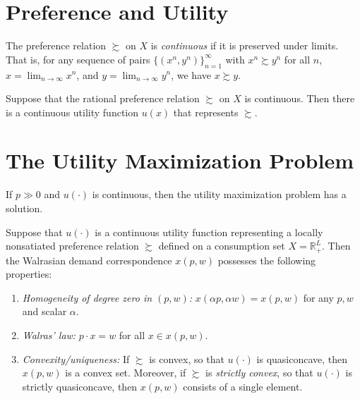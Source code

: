\section{Preference and Utility}

\begin{defn}
    The preference relation $\succsim$ on $X$ is \emph{continuous} if it is preserved under limits. That is, for any sequence of pairs $\{(x^n, y^n)\}^\infty_{n = 1}$ with $x^n \succsim y^n$ for all $n$, $x = \lim_{n \to \infty} x^n$, and $y = \lim_{n \to \infty} y^n$, we have $x \succsim y$.
\end{defn}

\begin{prop}
    Suppose that the rational preference relation $\succsim$ on $X$ is continuous. Then there is a continuous utility function $u(x)$ that represents $\succsim$.
\end{prop}


\section{The Utility Maximization Problem}

\begin{prop}
    If $p \gg 0$ and $u(\cdot)$ is continuous, then the utility maximization problem has a solution.
\end{prop}

\begin{prop}
    Suppose that $u(\cdot)$ is a continuous utility function representing a locally nonsatiated preference relation $\succsim$ defined on a consumption set $X = \mathbb{R}^L_+$. Then the Walrasian demand correspondence $x(p, w)$ possesses the following properties:
    \begin{enumerate}
        \item \emph{Homogeneity of degree zero in $(p, w)$:} $x(\alpha p, \alpha w) = x(p, w)$ for any $p, w$ and scalar $\alpha$.
        \item \emph{Walras' law:} $p \cdot x = w$ for all $x \in x(p, w)$.
        \item \emph{Convexity/uniqueness:} If $\succsim$ is convex, so that $u(\cdot)$ is quasiconcave, then $x(p, w)$ is a convex set. Moreover, if $\succsim$ is \emph{strictly convex}, so that $u(\cdot)$ is strictly quasiconcave, then $x(p, w)$ consists of a single element.
    \end{enumerate}
\end{prop}

